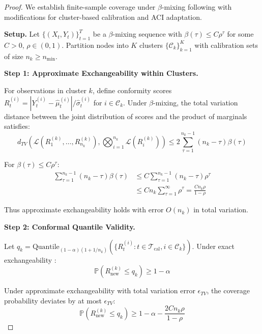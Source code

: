 \documentclass{article}
\theoremstyle{plain}
\theoremstyle{definition}
\theoremstyle{remark}
\begin{document}
\begin{proof}
We establish finite-sample coverage under $\beta$-mixing following \citet{barber2023conformal} with modifications for cluster-based calibration and ACI adaptation.

\textbf{Setup.} Let $\{(X_t, Y_t)\}_{t=1}^T$ be a $\beta$-mixing sequence with $\beta(\tau) \leq C\rho^\tau$ for some $C > 0$, $\rho \in (0,1)$. Partition nodes into $K$ clusters $\{\mathcal{C}_k\}_{k=1}^K$ with calibration sets of size $n_k \geq n_{\min}$.

\textbf{Step 1: Approximate Exchangeability within Clusters.}

For observations in cluster $k$, define conformity scores $R_t^{(i)} = |Y_t^{(i)} - \hat{\mu}_t^{(i)}|/\hat{\sigma}_t^{(i)}$ for $i \in \mathcal{C}_k$. Under $\beta$-mixing, the total variation distance between the joint distribution of scores and the product of marginals satisfies:
\begin{equation}
d_{TV}\left(\mathcal{L}(R_1^{(k)}, \ldots, R_{n_k}^{(k)}), \bigotimes_{i=1}^{n_k} \mathcal{L}(R_i^{(k)})\right) \leq 2\sum_{\tau=1}^{n_k-1} (n_k - \tau) \beta(\tau)
\end{equation}

For $\beta(\tau) \leq C\rho^\tau$:
\begin{align}
\sum_{\tau=1}^{n_k-1} (n_k - \tau) \beta(\tau) &\leq C \sum_{\tau=1}^{n_k-1} (n_k - \tau) \rho^\tau \\
&\leq C n_k \sum_{\tau=1}^\infty \rho^\tau = \frac{C n_k \rho}{1 - \rho}
\end{align}

Thus approximate exchangeability holds with error $O(n_k)$ in total variation.

\textbf{Step 2: Conformal Quantile Validity.}

Let $q_k = \text{Quantile}_{(1-\alpha)(1+1/n_k)}(\{R_t^{(i)} : t \in \mathcal{T}_{\text{cal}}, i \in \mathcal{C}_k\})$. Under exact exchangeability \citep{vovk2005algorithmic}:
\begin{equation}
\mathbb{P}(R_{\text{new}}^{(k)} \leq q_k) \geq 1 - \alpha
\end{equation}

Under approximate exchangeability with total variation error $\epsilon_{TV}$, the coverage probability deviates by at most $\epsilon_{TV}$:
\begin{equation}
\mathbb{P}(R_{\text{new}}^{(k)} \leq q_k) \geq 1 - \alpha - \frac{2Cn_k\rho}{1-\rho}
\end{equation}


\end{proof}
\end{document}

